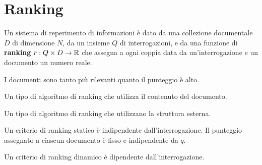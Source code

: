 \documentclass[\main/main.tex]{subfiles}
\begin{document}
\chapter{Ranking}
\begin{multicols}{2}
\begin{definition}
    Un sistema di reperimento di informazioni è dato da una collezione documentale \(D\) di dimensione \(N\), da un insieme \(Q\) di interrogazioni, e da una funzione di \textbf{ranking} \(r: Q \times D \rightarrow \mathbb{R}\) che assegna a ogni coppia data da un'interrogazione e un documento un numero reale.
    
    I documenti sono tanto più rilevanti quanto il punteggio è alto.
\end{definition}
\begin{definition}
    Un tipo di algoritmo di ranking che utilizza il contenuto del documento.
\end{definition}
\begin{definition}
    Un tipo di algoritmo di ranking che utilizzano la struttura esterna.
\end{definition}
\begin{definition}
    Un criterio di ranking statico è indipendente dall'interrogazione. Il punteggio assegnato a ciascun documento è fisso e indipendente da \(q\).
\end{definition}
\begin{definition}
    Un criterio di ranking dinamico è dipendente dall'interrogazione.
\end{definition}
\end{multicols}
\end{document}
